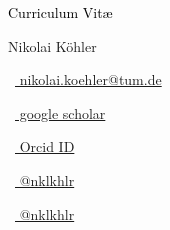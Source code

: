 \begin{scriptsize}
	 \textcolor{black}{Curriculum Vit\ae}
\end{scriptsize}

\vspace*{0.2cm}
\begin{Large}
	Nikolai K\"ohler
\end{Large}

\vspace*{0.20em}
%
\vspace*{0.2cm}

\begin{footnotesize}
	\quad
	\begin{tiny}\faEnvelope[regular]\end{tiny}~\href{mailto:nikolai.koehler@tum.de}{%
		nikolai.koehler@tum.de
	}
	\quad\vspace{.1cm}
	\begin{tiny}\faGraduationCap\end{tiny}~\href{https://scholar.google.com/citations?user=R-szd0IAAAAJ&hl=en&oi=ao}{
		 google scholar
		}
	\begin{tiny}\faOrcid\end{tiny}~\href{https://orcid.org/0000-0002-5103-883X?lang=en}{
		 Orcid ID
		}
	\quad\vspace{.15cm}

	\begin{tiny}\faTwitter\end{tiny}~\href{https://twitter.com/nklkhlr}{
		@nklkhlr
	}
	\quad
	\begin{tiny}\faGithub\end{tiny}~\href{https://github.com/nklkhlr}{
		@nklkhlr
	}

\end{footnotesize}
